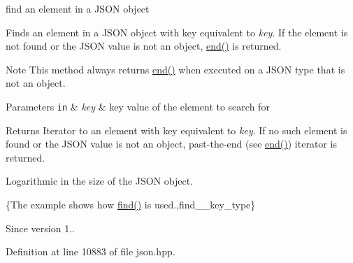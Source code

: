 find an element in a J\+S\+ON object 

Finds an element in a J\+S\+ON object with key equivalent to {\itshape key}. If the element is not found or the J\+S\+ON value is not an object, \hyperlink{classnlohmann_1_1basic__json_a13e032a02a7fd8a93fdddc2fcbc4763c}{end()} is returned.

\begin{DoxyNote}{Note}
This method always returns \hyperlink{classnlohmann_1_1basic__json_a13e032a02a7fd8a93fdddc2fcbc4763c}{end()} when executed on a J\+S\+ON type that is not an object.
\end{DoxyNote}

\begin{DoxyParams}[1]{Parameters}
\mbox{\tt in}  & {\em key} & key value of the element to search for\\
\hline
\end{DoxyParams}
\begin{DoxyReturn}{Returns}
Iterator to an element with key equivalent to {\itshape key}. If no such element is found or the J\+S\+ON value is not an object, past-\/the-\/end (see \hyperlink{classnlohmann_1_1basic__json_a13e032a02a7fd8a93fdddc2fcbc4763c}{end()}) iterator is returned.
\end{DoxyReturn}
Logarithmic in the size of the J\+S\+ON object.

\{The example shows how {\ttfamily \hyperlink{classnlohmann_1_1basic__json_aeed33787bd362c7ead59a4ba945392db}{find()}} is used.,find\+\_\+\+\_\+key\+\_\+type\}

\begin{DoxySince}{Since}
version 1.. 
\end{DoxySince}


Definition at line 10883 of file json.\+hpp.

